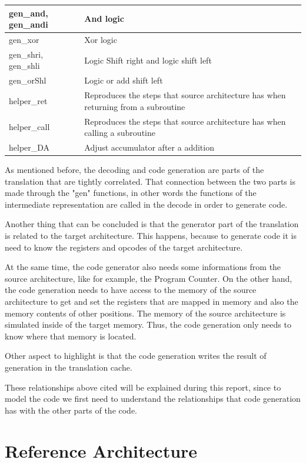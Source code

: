 \documentclass[11pt]{report}
\begin{document}
\begin{table}[H]
\begin{tabular}{|l|p{10cm}|}
			gen\_and, gen\_andi				  &	And logic \\ \hline 
			gen\_xor						  &	Xor logic \\ \hline 
			gen\_shri, gen\_shli			  &	Logic Shift right and logic shift left \\ \hline 
			gen\_orShl 						  &	Logic or add shift left\\ \hline 
			helper\_ret 					  & Reproduces the steps that source architecture has when returning from a subroutine	\\ \hline 
			helper\_call 					  & Reproduces the steps that source architecture has when calling a subroutine	\\ \hline 
			helper\_DA						  &	Adjust accumulator after a addition \\ \hline 
		\end{tabular}
	\end{table} 
	
	As mentioned before, the decoding and code generation are parts of the translation that are tightly correlated. That connection between the two parts is made through the "gen" functions, in other words the functions of the intermediate representation are called in the decode in order to generate code.
	
	Another thing that can be concluded is that the generator part of the translation is related to the target architecture. This happens, because to generate code it is need to know the registers and opcodes of the target architecture.
	
	At the same time, the code generator also needs some informations from the source architecture, like for example, the Program Counter.  On the other hand, the code generation needs to have access to the memory of the source architecture to get and set the registers that are mapped in memory and also the memory contents of other positions. The memory of the source architecture is simulated inside of the target memory.  Thus, the code generation only needs to know where that memory is located.
	
	Other aspect to highlight is that the code generation writes the result of generation in the translation cache.
	
	These relationships above cited will be explained during this report, since to model the code we first need to understand the relationships that code generation has with the other parts of the code.


	\section{Reference Architecture}
	
\end{document}
